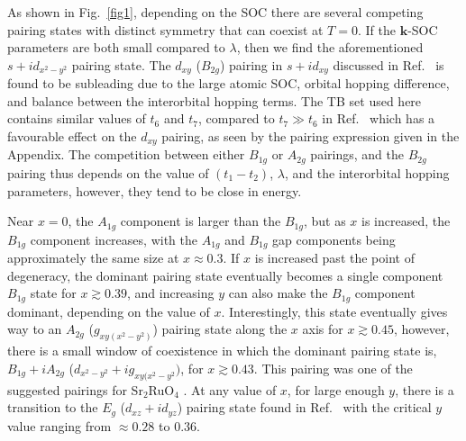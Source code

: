 \documentclass[%
reprint,
superscriptaddress,
 amsmath,amssymb,
 aps,
prb,
nobalancelastpage,
]{revtex4-2}
\begin{document}
As shown in Fig.~\ref{fig1}, depending on the SOC there are several competing pairing states with distinct symmetry that can coexist at $T=0$.  If the $\textbf{k}$-SOC parameters are both small compared to $\lambda$, then we find the aforementioned $s+id_{x^2-y^2}$ pairing state.  The $d_{xy}$ ($B_{2g}$) pairing in $s+id_{xy}$ discussed in Ref.~\cite{clepkens2021} is found to be subleading due to the large atomic SOC, orbital hopping difference, and balance between the interorbital hopping terms. The TB set used here contains similar values of $t_{6}$ and $t_{7}$, compared to $t_{7}\gg t_{6}$ in Ref.~\cite{clepkens2021} which has a favourable effect on the $d_{xy}$ pairing, as seen by the pairing expression given in the Appendix. The competition between either $B_{1g}$ or $A_{2g}$ pairings, and the $B_{2g}$ pairing thus depends on the value of $(t_{1}-t_{2})$, $\lambda$, and the interorbital hopping parameters, however, they tend to be close in energy. 



Near $x=0$, the $A_{1g}$ component is larger than the $B_{1g}$, but as $x$ is increased, the $B_{1g}$ component increases, with the $A_{1g}$ and $B_{1g}$ gap components being approximately the same size at $x\approx0.3$. If $x$ is increased past the point of degeneracy, the dominant pairing state eventually becomes a single component $B_{1g}$ state for $x\gtrsim0.39$, and increasing $y$ can also make the $B_{1g}$ component dominant, depending on the value of $x$. Interestingly, this state eventually gives way to an $A_{2g}$ ($g_{xy(x^2-y^2)}$) pairing state along the $x$ axis for $x\gtrsim0.45$, however, there is a small window of coexistence in which the dominant pairing state is, $B_{1g} + iA_{2g}$ ($d_{x^2-y^2}+ig_{xy(x^2-y^2})$, for $x\gtrsim0.43$. This pairing was one of the suggested pairings for Sr$_{2}$RuO$_{4}$ \cite{Kivelson2020npj, yuan2021}. At any value of $x$, for large enough $y$, there is a transition to the $E_{g}$ ($d_{xz}+id_{yz}$) pairing state found in Ref.~\cite{Suh2019} with the critical $y$ value ranging from $\approx 0.28$ to $0.36$. 
\end{document}
